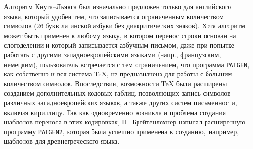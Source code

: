 \documentclass[12pt,a4paper,oneside]{extarticle}
\begin{document}
Алгоритм Кнута--Льянга был изначально предложен только для английского языка, который удобен тем, что записывается ограниченным количеством символов (26 букв латинской азбуки без диакритических знаков). Хотя алгоритм может быть применен к любому языку, в котором перенос строки основан на слогоделении и который записывается азбучным письмом, даже при попытке работать с другими западноевропейскими языками (напр., французским, немецким), пользователь встречается с тем ограничением, что программа \verb+PATGEN+, как собственно и вся система \TeX{}, не предназначена для работы с бо́льшим количеством символов. Впоследствии, возможности \TeX{} были расширены созданием дополнительных кодовых таблиц, позволяющих запись символов различных западноевропейских языков\autocite[Кодировка \textenglish{Extended \TeX{} Font Encoding Scheme} (ET). См. ][]{ferguson1990}, а также других систем письменности, включая кириллицу\autocite[Описание существующих кодировок см. ][]{mittelbach2016}. Так как одновременно возникла и проблема создания шаблонов переноса в этих кодировках, П.~Брейтенлохнер написал расширенную программу \verb+PATGEN2+\autocite[См. описание в пособии ][]{patgen2}, которая была успешно применена к созданию, например, шаблонов для древнегреческого языка\autocite[][]{haralambous1992}.
\end{document}
